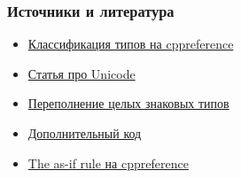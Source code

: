 \documentclass[compress, 8pt]{beamer}
\begin{document}
\begin{frame}

    \frametitle{Источники и литература}

    \begin{itemize}

        \item \href{https://en.cppreference.com/w/cpp/language/type}
            {Классификация типов на cppreference}
        \item \href{https://habr.com/ru/companies/wunderfund/articles/777850/}
            {Статья про Unicode}
        \item \href{https://github.com/Nekrolm/ubbook/blob/master/numeric/overflow.md}
            {Переполнение целых знаковых типов}
        \item \href{https://ru.wikipedia.org/wiki/\%D0\%94\%D0\%BE\%D0\%BF\%D0\%BE\%D0\%BB\%D0\%BD\%D0\%B8\%D1\%82\%D0\%B5\%D0\%BB\%D1\%8C\%D0\%BD\%D1\%8B\%D0\%B9_\%D0\%BA\%D0\%BE\%D0\%B4}
            {Дополнительный код}
        \item \href{https://en.cppreference.com/w/cpp/language/as\_if}
            {The as-if rule на cppreference}

    \end{itemize}

\end{frame}
\end{document}

